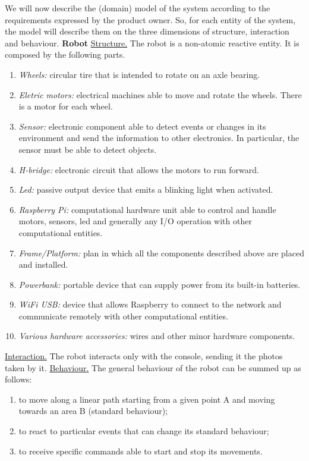 \documentclass[a4paper]{article}
\begin{document}
We will now describe the (domain) model of the system according to the requirements expressed by the product owner. So, for each entity of the system, the model will describe them on the three dimensions of structure, interaction and behaviour.\newline\newline
{\large\textbf{Robot}}\newline\newline
\underline{Structure.} The robot is a non-atomic reactive entity. It is composed by the following parts.
\begin{enumerate}
	\item \textit{Wheels:} circular tire that is intended to rotate on an axle bearing.
	\item \textit{Eletric motors:} electrical machines able to move and rotate the wheels. There is a motor for each wheel.
	\item \textit{Sensor:} electronic component able to detect events or changes in its environment and send the information to other electronics. In particular, the sensor must be able to detect objects.
	\item \textit{H-bridge:} electronic circuit that allows the motors to run forward.
	\item \textit{Led:} passive output device that emits a blinking light when activated.
	\item \textit{Raspberry Pi:} computational hardware unit able to control and handle motors, sensors, led and generally any I/O operation with other computational entities.
	\item \textit{Frame/Platform:} plan in which all the components described above are placed and installed.
	\item \textit{Powerbank:} portable device that can supply power from its built-in batteries.
	\item \textit{WiFi USB:} device that allows Raspberry to connect to the network and communicate remotely with other computational entities.
	\item \textit{Various hardware accessories:} wires and other minor hardware components.
\end{enumerate}
\underline{Interaction.} The robot interacts only with the console, sending it the photos taken by it.\newline\newline
\underline{Behaviour.} The general behaviour of the robot can be summed up as follows:
	\begin{enumerate}
		\item to move along a linear path starting from a given point A and moving towards an area B (standard behaviour);
		\item to react to particular events that can change its standard behaviour;
		\item to receive specific commands able to start and stop its movements.
	\end{enumerate}
\end{document}
